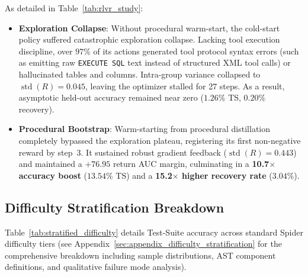 \documentclass{article}
\theoremstyle{plain}
\theoremstyle{definition}
\theoremstyle{remark}
\begin{document}
As detailed in Table~\ref{tab:rlvr_study}:
\begin{itemize}[leftmargin=*,itemsep=2pt]
    \item \textbf{Exploration Collapse}: Without procedural warm-start, the cold-start policy suffered catastrophic exploration collapse. Lacking tool execution discipline, over $97\%$ of its actions generated tool protocol syntax errors (such as emitting raw \texttt{EXECUTE SQL} text instead of structured XML tool calls) or hallucinated tables and columns. Intra-group variance collapsed to $\operatorname{std}(R) = 0.045$, leaving the optimizer stalled for 27 steps. As a result, asymptotic held-out accuracy remained near zero ($1.26\%$ TS, $0.20\%$ recovery).
    \item \textbf{Procedural Bootstrap}: Warm-starting from procedural distillation completely bypassed the exploration plateau, registering its first non-negative reward by step~3. It sustained robust gradient feedback ($\operatorname{std}(R) = 0.443$) and maintained a $+76.95$ return AUC margin, culminating in a \textbf{10.7$\times$ accuracy boost} ($13.54\%$ TS) and a \textbf{15.2$\times$ higher recovery rate} ($3.04\%$).
\end{itemize}

\subsection{Difficulty Stratification Breakdown}
Table~\ref{tab:stratified_difficulty} details Test-Suite accuracy across standard Spider difficulty tiers (see Appendix~\ref{sec:appendix_difficulty_stratification} for the comprehensive breakdown including sample distributions, AST component definitions, and qualitative failure mode analysis).
\end{document}
